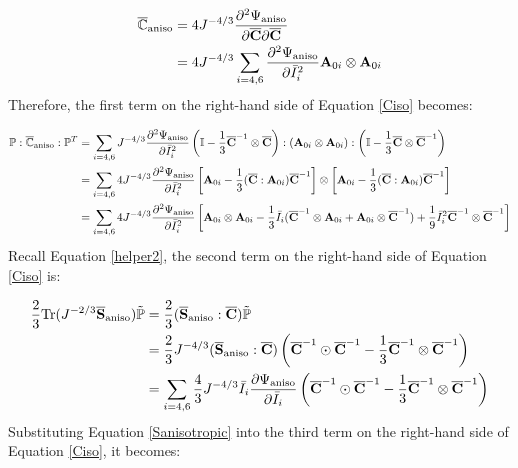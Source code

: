 \begin{equation}
\begin{split}
\overline{\mathbb{C}}_\mathrm{aniso} 
&= 4J^{-4/3}\frac{\partial^2\Psi_\mathrm{aniso}}{\partial\overline{\bold{C}}\partial\overline{\bold{C}}} \\
&= 4J^{-4/3}\sum_{i = 4, 6}\frac{\partial^2\Psi_\mathrm{aniso}}{\partial{\bar{I}_i}^2}\bold{A}_{0i} \otimes \bold{A}_{0i}
\end{split}
\end{equation}
Therefore, the first term on the right-hand side of Equation \ref{Ciso} becomes:

\begin{equation} \label{part13}
\begin{split}
\mathbb{P} : \overline{\mathbb{C}}_\mathrm{aniso} : \mathbb{P}^T 
&= \sum_{i = 4, 6}J^{-4/3}\frac{\partial^2\Psi_\mathrm{aniso}}{\partial{\bar{I}_i}^2} \left( \mathbb{I} - \frac{1}{3}\overline{\bold{C}}^{-1} \otimes \overline{\bold{C}} \right):(\bold{A}_{0i} \otimes \bold{A}_{0i}):\left( \mathbb{I} - \frac{1}{3}\overline{\bold{C}} \otimes \overline{\bold{C}}^{-1} \right) \\
&= \sum_{i = 4, 6} 4J^{-4/3}\frac{\partial^2\Psi_\mathrm{aniso}}{\partial{\bar{I}_i}^2}
\left[ \bold{A}_{0i} - \frac{1}{3}(\overline{\bold{C}} : \bold{A}_{0i})\overline{\bold{C}}^{-1} \right] \otimes
\left[ \bold{A}_{0i} - \frac{1}{3}(\overline{\bold{C}} : \bold{A}_{0i})\overline{\bold{C}}^{-1} \right] \\
&= \sum_{i = 4, 6} 4J^{-4/3}\frac{\partial^2\Psi_\mathrm{aniso}}{\partial{\bar{I}_i}^2}
\left[ \bold{A}_{0i} \otimes \bold{A}_{0i} - \frac{1}{3}\bar{I}_i
(\overline{\bold{C}}^{-1} \otimes \bold{A}_{0i} + \bold{A}_{0i} \otimes \overline{\bold{C}}^{-1}) 
+ \frac{1}{9}\bar{I}_i^2 \overline{\bold{C}}^{-1} \otimes \overline{\bold{C}}^{-1} \right]
\end{split}
\end{equation}
Recall Equation \ref{helper2}, the second term on the right-hand side of Equation \ref{Ciso} is:

\begin{equation} \label{part23}
\begin{split}
\frac{2}{3}\mathrm{Tr}(J^{-2/3}\overline{\bold{S}}_\mathrm{aniso})\tilde{\mathbb{P}} &= \frac{2}{3}(\overline{\bold{S}}_\mathrm{aniso} : \overline{\bold{C}}) \tilde{\mathbb{P}} \\
&= \frac{2}{3}J^{-4/3}(\overline{\bold{S}}_\mathrm{aniso} : \overline{\bold{C}}) 
\left( \overline{\bold{C}}^{-1} \odot \overline{\bold{C}}^{-1} - \frac{1}{3}\overline{\bold{C}}^{-1}\otimes\overline{\bold{C}}^{-1} \right) \\
&= \sum_{i = 4, 6}\frac{4}{3}J^{-4/3}\bar{I}_i\frac{\partial{\Psi_\mathrm{aniso}}}{\partial\bar{I}_i}
\left( \overline{\bold{C}}^{-1} \odot \overline{\bold{C}}^{-1} - \frac{1}{3}\overline{\bold{C}}^{-1}\otimes\overline{\bold{C}}^{-1} \right) \\
\end{split}
\end{equation}
Substituting Equation \ref{Sanisotropic} into the third term on the right-hand side of Equation \ref{Ciso}, it becomes:

